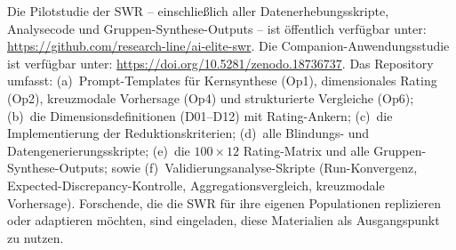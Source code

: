 \documentclass[11pt,a4paper]{article}
\theoremstyle{definition}
\theoremstyle{plain}
\theoremstyle{remark}
\begin{document}
\noindent Die Pilotstudie der SWR -- einschlie\ss{}lich aller Datenerhebungsskripte, Analysecode und Gruppen-Synthese-Outputs -- ist \"offentlich verf\"ugbar unter: \url{https://github.com/research-line/ai-elite-swr}. Die Companion-Anwendungsstudie ist verf\"ugbar unter: \url{https://doi.org/10.5281/zenodo.18736737}. Das Repository umfasst: (a)~Prompt-Templates f\"ur Kernsynthese (Op1), dimensionales Rating (Op2), kreuzmodale Vorhersage (Op4) und strukturierte Vergleiche (Op6); (b)~die Dimensionsdefinitionen (D01--D12) mit Rating-Ankern; (c)~die Implementierung der Reduktionskriterien; (d)~alle Blindungs- und Datengenerierungsskripte; (e)~die $100 \times 12$ Rating-Matrix und alle Gruppen-Synthese-Outputs; sowie (f)~Validierungsanalyse-Skripte (Run-Konvergenz, Expected-Discrepancy-Kontrolle, Aggregationsvergleich, kreuzmodale Vorhersage). Forschende, die die SWR f\"ur ihre eigenen Populationen replizieren oder adaptieren m\"ochten, sind eingeladen, diese Materialien als Ausgangspunkt zu nutzen.

\newpage
\end{document}
